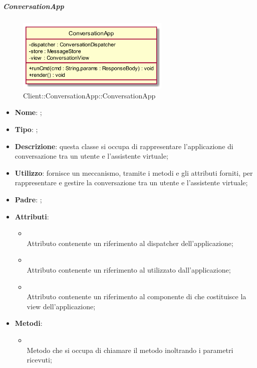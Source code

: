 \hypertarget{ConversationApp_label}{\subparagraph{ConversationApp}}
\begin{figure}[h]
	\centering
	\includegraphics[width=0.65\textwidth,height=\textheight,keepaspectratio]{images/ClassConversationApp.png}
	\caption{Client::ConversationApp::ConversationApp}
\end{figure}
\begin{itemize}
	\item \textbf{Nome}: ;
	\item \textbf{Tipo}: ;
	\item \textbf{Descrizione}: questa classe si occupa di rappresentare l'applicazione di conversazione tra un utente e l'assistente virtuale;
	\item \textbf{Utilizzo}: fornisce un meccanismo, tramite i metodi e gli attributi forniti, per rappresentare e gestire la conversazione tra un utente e l'assistente virtuale;
	\item \textbf{Padre}: ;
	\item \textbf{Attributi}:
	\begin{itemize}
		\item[]  \\
		Attributo contenente un riferimento al dispatcher dell'applicazione;
		\item[]  \\
		Attributo contenente un riferimento al  utilizzato dall'applicazione;
		\item[]  \\
		Attributo contenente un riferimento al componente di  che costituisce la view dell'applicazione;
	\end{itemize}
	\item \textbf{Metodi}:
	\begin{itemize}
		\item[]  \\		Metodo che si occupa di chiamare il metodo  inoltrando i parametri ricevuti;\\

\end{itemize}
\end{itemize}
